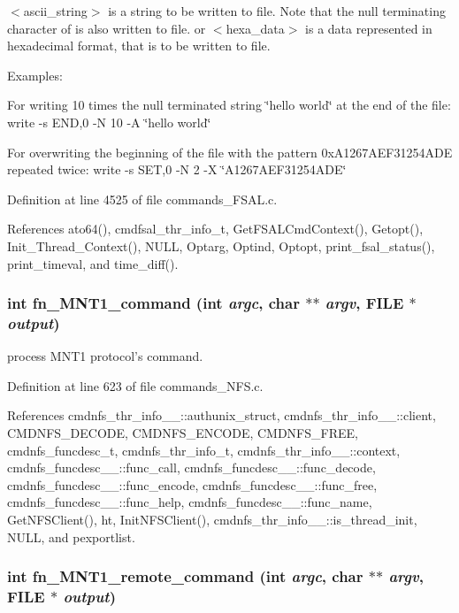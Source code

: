 $<$ascii\_\-string$>$ is a string to be written to file. Note that the null terminating character of is also written to file. or $<$hexa\_\-data$>$ is a data represented in hexadecimal format, that is to be written to file.

Examples:

For writing 10 times the null terminated string \char`\"{}hello world\char`\"{} at the end of the file: write -s END,0 -N 10 -A \char`\"{}hello world\char`\"{}

For overwriting the beginning of the file with the pattern 0x\-A1267AEF31254ADE repeated twice: write -s SET,0 -N 2 -X \char`\"{}A1267AEF31254ADE\char`\"{} 

Definition at line 4525 of file commands\_\-FSAL.c.

References ato64(), cmdfsal\_\-thr\_\-info\_\-t, Get\-FSALCmd\-Context(), Getopt(), Init\_\-Thread\_\-Context(), NULL, Optarg, Optind, Optopt, print\_\-fsal\_\-status(), print\_\-timeval, and time\_\-diff().
\subsubsection{\setlength{\rightskip}{0pt plus 5cm}int fn\_\-MNT1\_\-command (int {\em argc}, char $\ast$$\ast$ {\em argv}, FILE $\ast$ {\em output})}\label{commands_8h_a61}


process MNT1 protocol's command. 

Definition at line 623 of file commands\_\-NFS.c.

References cmdnfs\_\-thr\_\-info\_\-\_\-::authunix\_\-struct, cmdnfs\_\-thr\_\-info\_\-\_\-::client, CMDNFS\_\-DECODE, CMDNFS\_\-ENCODE, CMDNFS\_\-FREE, cmdnfs\_\-funcdesc\_\-t, cmdnfs\_\-thr\_\-info\_\-t, cmdnfs\_\-thr\_\-info\_\-\_\-::context, cmdnfs\_\-funcdesc\_\-\_\-::func\_\-call, cmdnfs\_\-funcdesc\_\-\_\-::func\_\-decode, cmdnfs\_\-funcdesc\_\-\_\-::func\_\-encode, cmdnfs\_\-funcdesc\_\-\_\-::func\_\-free, cmdnfs\_\-funcdesc\_\-\_\-::func\_\-help, cmdnfs\_\-funcdesc\_\-\_\-::func\_\-name, Get\-NFSClient(), ht, Init\-NFSClient(), cmdnfs\_\-thr\_\-info\_\-\_\-::is\_\-thread\_\-init, NULL, and pexportlist.
\subsubsection{\setlength{\rightskip}{0pt plus 5cm}int fn\_\-MNT1\_\-remote\_\-command (int {\em argc}, char $\ast$$\ast$ {\em argv}, FILE $\ast$ {\em output})}\label{commands_8h_a82}


